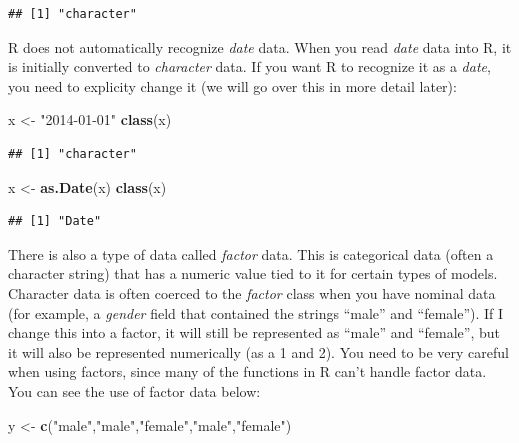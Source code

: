 \documentclass[]{book}
\newenvironment{Shaded}{\begin{snugshade}}{\end{snugshade}}
\newcommand{\KeywordTok}[1]{\textcolor[rgb]{0.13,0.29,0.53}{\textbf{{#1}}}}
\newcommand{\StringTok}[1]{\textcolor[rgb]{0.31,0.60,0.02}{{#1}}}
\newcommand{\NormalTok}[1]{{#1}}
\begin{document}
\begin{verbatim}
## [1] "character"
\end{verbatim}

R does not automatically recognize \emph{date} data. When you read
\emph{date} data into R, it is initially converted to \emph{character}
data. If you want R to recognize it as a \emph{date}, you need to
explicity change it (we will go over this in more detail later):

\begin{Shaded}
\begin{Highlighting}[]
\NormalTok{x <-}\StringTok{ "2014-01-01"}
\KeywordTok{class}\NormalTok{(x)}
\end{Highlighting}
\end{Shaded}

\begin{verbatim}
## [1] "character"
\end{verbatim}

\begin{Shaded}
\begin{Highlighting}[]
\NormalTok{x <-}\StringTok{ }\KeywordTok{as.Date}\NormalTok{(x)}
\KeywordTok{class}\NormalTok{(x)}
\end{Highlighting}
\end{Shaded}

\begin{verbatim}
## [1] "Date"
\end{verbatim}

There is also a type of data called \emph{factor} data. This is
categorical data (often a character string) that has a numeric value
tied to it for certain types of models. Character data is often coerced
to the \emph{factor} class when you have nominal data (for example, a
\emph{gender} field that contained the strings ``male'' and ``female'').
If I change this into a factor, it will still be represented as ``male''
and ``female'', but it will also be represented numerically (as a 1 and
2). You need to be very careful when using factors, since many of the
functions in R can't handle factor data. You can see the use of factor
data below:

\begin{Shaded}
\begin{Highlighting}[]
\NormalTok{y <-}\StringTok{ }\KeywordTok{c}\NormalTok{(}\StringTok{"male"}\NormalTok{,}\StringTok{"male"}\NormalTok{,}\StringTok{"female"}\NormalTok{,}\StringTok{"male"}\NormalTok{,}\StringTok{"female"}\NormalTok{)}
\end{Highlighting}
\end{Shaded}
\end{document}
